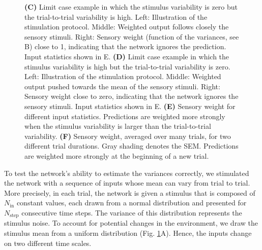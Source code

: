 \documentclass[10pt,a4paper]{article}
\begin{document}
\begin{figure}[t!]
{{\bf (C)} Limit case example in which the stimulus variability is zero but the trial-to-trial variability is high. Left: Illustration of the stimulation protocol. Middle: Weighted output follows closely the sensory stimuli. Right: Sensory weight (function of the variances, see B) close to 1, indicating that the network ignores the prediction. Input statistics shown in E.
{\bf (D)} Limit case example in which the stimulus variability is high but the trial-to-trial variability is zero. Left: Illustration of the stimulation protocol. Middle: Weighted output pushed towards the mean of the sensory stimuli. Right: Sensory weight close to zero, indicating that the network ignores the sensory stimuli. Input statistics shown in E.
{\bf (E)} Sensory weight for different input statistics. Predictions are weighted more strongly when the stimulus variability is larger than the trial-to-trial variability.
{\bf (F)} Sensory weight, averaged over many trials, for two different trial durations. Gray shading denotes the SEM. Predictions are weighted more strongly at the beginning of a new trial. 
}
\label{fig:Fig_3}
\end{figure}
%

To test the network's ability to estimate the variances correctly, we stimulated the network with a sequence of inputs whose mean can vary from trial to trial. More precisely, in each trial, the network is given a stimulus that is composed of $N_\mathrm{in}$ constant values, each drawn from a normal distribution and presented for $N_\mathrm{step}$ consecutive time steps. The variance of this distribution represents the stimulus noise. To account for potential changes in the environment, we draw the stimulus mean from a uniform distribution (Fig. \ref{fig:Fig_3}A). Hence, the inputs change on two different time scales.
\end{document}
